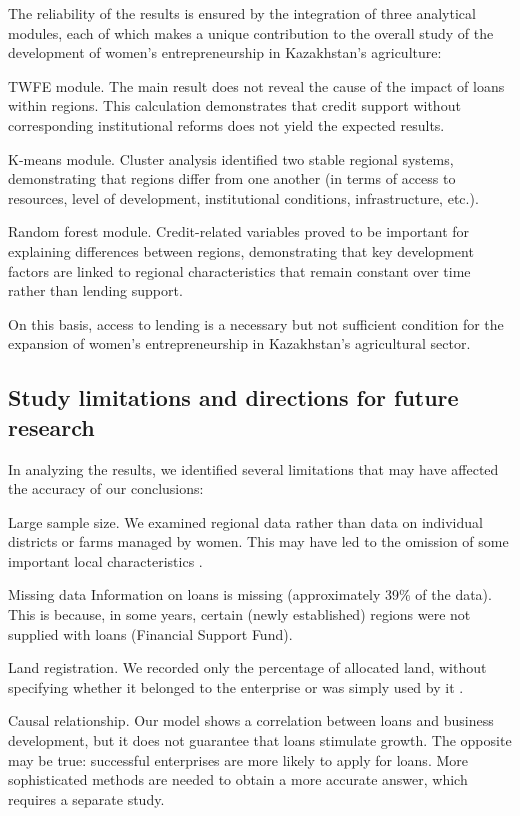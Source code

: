 ﻿\documentclass[pdflatex,sn-mathphys-ay]{sn-jnl}
\begin{document}
The reliability of the results is ensured by the integration of three
analytical modules, each of which makes a unique contribution to the
overall study of the development of women's entrepreneurship in
Kazakhstan's agriculture:

TWFE module. The main result does not reveal the cause of the impact of
loans within regions. This calculation demonstrates that credit support
without corresponding institutional reforms does not yield the expected
results.

K-means module. Cluster analysis identified two stable regional systems,
demonstrating that regions differ from one another (in terms of access
to resources, level of development, institutional conditions,
infrastructure, etc.).

Random forest module. Credit-related variables proved to be important
for explaining differences between regions, demonstrating that key
development factors are linked to regional characteristics that remain
constant over time rather than lending support.

On this basis, access to lending is a necessary but not sufficient
condition for the expansion of women's entrepreneurship in Kazakhstan's
agricultural sector.

\subsection{Study limitations and directions for future research}

In analyzing the results, we identified several limitations that may
have affected the accuracy of our conclusions:

Large sample size. We examined regional data rather than data on
individual districts or farms managed by women. This may have led to the
omission of some important local characteristics \citep{ref36}.

Missing data Information on loans is missing (approximately 39\% of the
data). This is because, in some years, certain (newly established)
regions were not supplied with loans (Financial Support Fund).

Land registration. We recorded only the percentage of allocated land,
without specifying whether it belonged to the enterprise or was simply
used by it \citep{ref52}.

Causal relationship. Our model shows a correlation between loans and
business development, but it does not guarantee that loans stimulate
growth. The opposite may be true: successful enterprises are more likely
to apply for loans. More sophisticated methods are needed to obtain a
more accurate answer, which requires a separate study.
\end{document}
